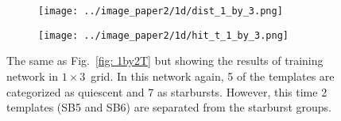             \begin{figure}
                \begin{subfigure}[b]{\textwidth}
                    \centering
                    \texttt{[image: ../image\_paper2/1d/dist\_1\_by\_3.png]}
                \end{subfigure}
                \hfill
                \begin{subfigure}[b]{\textwidth}
                     \texttt{[image: ../image\_paper2/1d/hit\_t\_1\_by\_3.png]}
                \end{subfigure}
                \caption[Results of training network in $1\times3$~grid]{The same as Fig.~\ref{fig: 1by2T} but showing the results of training network in $1\times3$~grid. In this network again, 5 of the \citet{Kinney96} templates are categorized as quiescent and 7 as starbursts. However, this time 2 templates (SB5 and SB6) are separated from the starburst groups.}
                 \label{fig: 1by3T}
            \end{figure}
           
